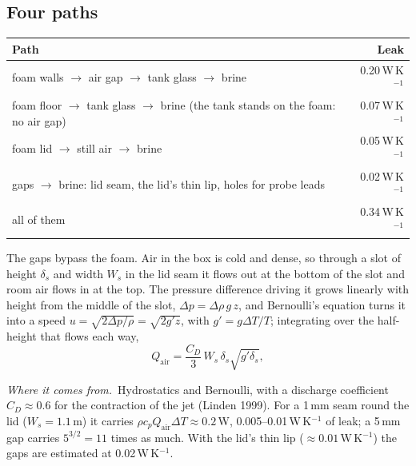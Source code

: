 \documentclass[11pt,a4paper]{article}
\newcommand{\where}{\par\noindent\textit{Where it comes from.}\ }
\begin{document}
\subsection{Four paths}
\begin{center}\small
\begin{tabular}{@{}l r@{}}
\toprule
Path & Leak \\ \midrule
foam walls $\to$ air gap $\to$ tank glass $\to$ brine & 0.20\,W\,K$^{-1}$ \\
foam floor $\to$ tank glass $\to$ brine (the tank stands on the foam: no air gap) & 0.07\,W\,K$^{-1}$ \\
foam lid $\to$ still air $\to$ brine & 0.05\,W\,K$^{-1}$ \\
gaps $\to$ brine: lid seam, the lid's thin lip, holes for probe leads & 0.02\,W\,K$^{-1}$ \\ \midrule
all of them & 0.34\,W\,K$^{-1}$ \\
\bottomrule
\end{tabular}
\end{center}
The gaps bypass the foam. Air in the box is cold and dense, so through a slot of height $\delta_s$ and
width $W_s$ in the lid seam it flows out at the bottom of the slot and room air flows in at the top. The pressure
difference driving it grows linearly with height from the middle of the slot,
$\Delta p = \Delta\rho\,g\,z$, and Bernoulli's equation turns it into a speed
$u = \sqrt{2\Delta p/\rho} = \sqrt{2g'z}$, with $g' = g\Delta T/T$; integrating over the half-height that
flows each way,
\begin{equation}
Q_{\text{air}} = \frac{C_D}{3}\,W_s\,\delta_s\sqrt{g'\delta_s},
\label{eq:exchange}
\end{equation}
\where Hydrostatics and Bernoulli, with a discharge coefficient $C_D \approx 0.6$ for the contraction
of the jet (Linden 1999). For a 1\,mm seam round the lid ($W_s = 1.1$\,m) it carries
$\rho c_p Q_{\text{air}}\Delta T \approx 0.2$\,W, 0.005–0.01\,W\,K$^{-1}$ of leak; a 5\,mm gap carries
$5^{3/2} = 11$ times as much. With the lid's thin lip ($\approx 0.01$\,W\,K$^{-1}$) the gaps are estimated at 0.02\,W\,K$^{-1}$.
\end{document}
